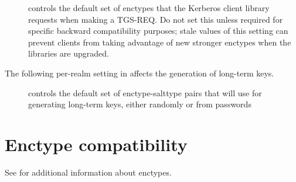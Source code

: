 \documentclass[letterpaper,10pt,english]{sphinxmanual}
\begin{document}
\begin{description}
\item[{}] \leavevmode
controls the default set of enctypes that the Kerberos client
library requests when making a TGS-REQ.  Do not set this unless
required for specific backward compatibility purposes; stale
values of this setting can prevent clients from taking advantage
of new stronger enctypes when the libraries are upgraded.

\end{description}

The following per-realm setting in {\hyperref[\detokenize{admin/conf_files/kdc_conf:kdc-conf-5}]{}} affects the
generation of long-term keys.
\begin{description}
\item[{}] \leavevmode
controls the default set of enctype-salttype pairs that {\hyperref[\detokenize{admin/admin_commands/kadmind:kadmind-8}]{}}
will use for generating long-term keys, either randomly or from
passwords

\end{description}


\section{Enctype compatibility}
\label{\detokenize{admin/enctypes:enctype-compatibility}}
See {\hyperref[\detokenize{admin/conf_files/kdc_conf:encryption-types}]{}} for additional information about enctypes.
\end{document}
